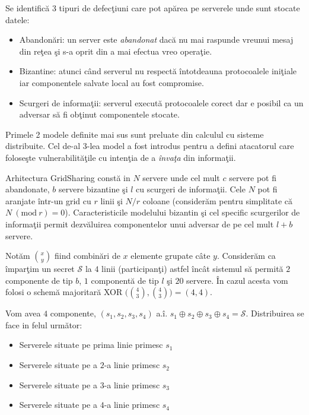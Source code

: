\documentclass{llncs}
\newcommand{\Mod}[1]{\ (\text{mod}\ #1)}
\begin{document}
Se identific\u{a} 3 tipuri de defec\c{t}iuni care pot ap\u{a}rea pe serverele unde sunt stocate datele:
\begin{itemize}
	\item Abandon\u{a}ri: un server este \textit{abandonat} dac\u{a} nu mai raspunde vreunui mesaj din re\c{t}ea \c{s}i s-a oprit din a mai efectua vreo opera\c{t}ie.
	\item Bizantine: atunci c\^{a}nd serverul nu respect\u{a} \^{i}ntotdeauna protocoalele ini\c{t}iale iar componentele salvate local au fost compromise.
	\item Scurgeri de informa\c{t}ii: serverul execut\u{a} protocoalele corect dar e posibil ca un adversar s\u{a} fi ob\c{t}inut componentele stocate.
\end{itemize}
Primele 2 modele definite mai sus sunt preluate din calculul cu sisteme distribuite. Cel de-al 3-lea model a fost introdus pentru a defini atacatorul care folose\c{s}te vulnerabilit\u{a}\c{t}ile cu inten\c{t}ia de a \textit{\^{i}nva\c{t}a} din informa\c{t}ii.

Arhitectura GridSharing const\u{a} in $N$ servere unde cel mult $c$ servere pot fi abandonate, $b$ servere bizantine \c{s}i $l$ cu scurgeri de informa\c{t}ii. Cele $N$ pot fi aranjate \^{i}ntr-un grid cu $r$ linii \c{s}i $N/r$ coloane (consider\u{a}m pentru simplitate c\u{a} $N \Mod r = 0$). Caracteristicile modelului bizantin \c{s}i cel specific scurgerilor de informa\c{t}ii permit dezv\u{a}luirea componentelor unui adversar de pe cel mult $l + b$ servere.

\begin{example}

	Not\u{a}m ${x \choose y}$ fiind combin\u{a}ri de $x$ elemente grupate c\^{a}te $y$.
	Consider\u{a}m ca \^{i}mpar\c{t}im un secret $\mathcal{S}$ la $4$ linii (participan\c{t}i) astfel \^{i}nc\^{a}t sistemul s\u{a} permit\u{a} $2$ componente de tip $b$, $1$ component\u{a} de tip $l$ \c{s}i $20$ servere. \^{I}n cazul acesta vom folosi o schem\u{a} majoritar\u{a} XOR $\big( {4 \choose 3}, {4 \choose 3}\big) = (4,4)$.

	Vom avea $4$ componente, $(s_1, s_2, s_3, s_4)$ a.\^{i}. $s_1 \oplus s_2 \oplus s_3 \oplus s_4 = \mathcal{S}$.
	Distribuirea se face in felul urm\u{a}tor:
	\begin{itemize}
		\item Serverele situate pe prima linie primesc $s_1$
		\item Serverele situate pe a $2$-a linie primesc $s_2$
		\item Serverele situate pe a $3$-a linie primesc $s_3$
		\item Serverele situate pe a $4$-a linie primesc $s_4$
	\end{itemize}
\end{example}
\end{document}
